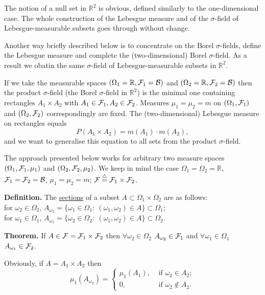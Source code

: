 \documentclass[a4paper,10pt]{article}
\def\RR{\mathbb{R}}
\newcommand{\1}[1]{\mathbf{1}_{\{#1\}}}
\newcommand{\defi}{\stackrel{\triangle}{=}}
\begin{document}
The notion of a null set in $\RR^2$ is obvious, defined similarly to the one-dimensional case. The whole construction of the Lebesgue measure and of the $\sigma$-field of Lebesgue-measurable subsets goes through without change.

Another way briefly described below is to concentrate on the Borel $\sigma$-fields, define the Lebesgue measure and complete the (two-dimen\-sional) Borel $\sigma$-field. As a result we obatin the same $\sigma$-field of Lebesgue-measurable subsets in $\RR^2$.

If we take the measurable spaces $(\Omega_1=\RR,{\cal F}_1={\cal B})$ and $(\Omega_2=\RR,{\cal F}_2={\cal B})$ then the product $\sigma$-field (the Borel $\sigma$-field in $\RR^2$) is the minimal one containing rectangles $A_1\times A_2$ with $A_1\in{\cal F}_1,A_2\in{\cal F}_2$. Measures $\mu_1=\mu_2=m$ on $(\Omega_1,{\cal F}_1)$ and $(\Omega_2,{\cal F}_2)$ correspondingly are fixed.
The (two-dimensional) Lebesgue measure on rectangles equals
  $$P(A_1\times A_2)=m(A_1)\cdot m(A_2),$$
and we want to generalise this equation to all sets from the product $\sigma$-field.

The approach presented below works for arbitrary two measure spaces $(\Omega_1,{\cal F}_1,\mu_1)$ and $(\Omega_2,{\cal F}_2,\mu_2)$. We keep in mind the case $\Omega_1=\Omega_2=\RR$, ${\cal F}_1={\cal F}_2={\cal B}$, $\mu_1=\mu_2=m$; ${\cal F}\defi {\cal F}_1\times{\cal F}_2$. \vspace{5mm}

{\bf Definition.} The \underline{sections} of a subset $A\subset \Omega_1\times\Omega_2$ are as follows:\\
for $\omega_2\in\Omega_2$, $A_{\omega_2}=\{\omega_1\in\Omega_1:~(\omega_1,\omega_2)\in A\}\subset \Omega_1$;\\
for $\omega_1\in\Omega_1$, $A_{\omega_1}=\{\omega_2\in\Omega_2:~(\omega_1,\omega_2)\in A\}\subset \Omega_2$. \vspace{3mm}

{\bf Theorem.} If $A\in{\cal F}={\cal F}_1\times{\cal F}_2$ then $\forall\omega_2\in\Omega_2$ $A_{\omega_2}\in{\cal F}_1$ and $\forall\omega_1\in\Omega_1$ $A_{\omega_1}\in{\cal F}_2$.\vspace{3mm}

Obviously, if $A=A_1\times A_2$ then
  $$\mu_1(A_{\omega_2})=\left\{\begin{array}{ll}
\mu_1(A_1), & \mbox{ if } \omega_2\in A_2; \\ 0, & \mbox{ if } \omega_2\notin A_2. \end{array}\right. $$ \vspace{4cm}
\end{document}
